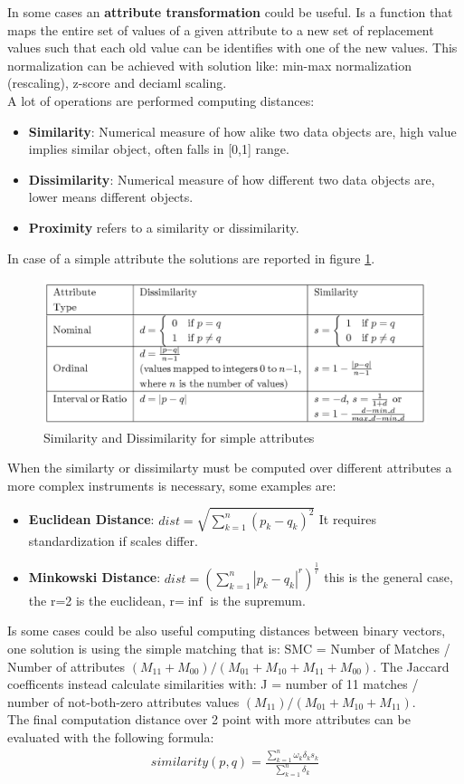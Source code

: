 \documentclass[12pt]{article}
\begin{document}
In some cases an \textbf{attribute transformation} could be useful. Is a function that maps the entire set of values of a given attribute to a new set of replacement values such that each old value can be identifies with one of the new values. This normalization can be achieved with solution like: min-max normalization (rescaling), z-score and deciaml scaling.\\
A lot of operations are performed computing distances:
\begin{itemize}
  \item \textbf{Similarity}: Numerical measure of how alike two data objects are, high value implies similar object, often falls in [0,1] range.
  \item \textbf{Dissimilarity}: Numerical measure of how different two data objects are, lower means different objects.
  \item \textbf{Proximity} refers to a similarity or dissimilarity.
\end{itemize}
In case of a simple attribute the solutions are reported in figure \ref{fig:simdis}.
\begin{figure}[hp!]
  \includegraphics[width=0.9\linewidth]{images/simdis.png}
  \caption{Similarity and Dissimilarity for simple attributes}
  \label{fig:simdis}
\end{figure}
When the similarty or dissimilarty must be computed over different attributes a more complex instruments is necessary, some examples are:
\begin{itemize}
  \item \textbf{Euclidean Distance}: $dist=\sqrt{\sum_{k=1}^{n}(p_k - q_k)^2}$ It requires standardization if scales differ.
  \item \textbf{Minkowski Distance}: $dist=(\sum_{k=1}^{n}|p_k - q_k|^r)^\frac{1}{r}$ this is the general case, the r=2 is the euclidean, r=$\inf$ is the supremum.
\end{itemize}

Is some cases could be also useful computing distances between binary vectors, one solution is using the simple matching that is: SMC = Number of Matches / Number of attributes $(M_11 + M_00) / (M_01 + M_10 + M_11 + M_00)$. The Jaccard coefficents instead calculate similarities with: J = number of 11 matches / number of not-both-zero attributes values $(M_11) / (M_01 + M_10 + M_11)$.\\
The final computation distance over 2 point with more attributes can be evaluated with the following formula:
\begin{equation}
  \begin{gathered}
    similarity(p,q) = \frac{\sum_{k=1}^{n} \omega_k \delta_k s_k}{\sum_{k=1}^{n} \delta_k}
  \end{gathered}
\end{equation}
\end{document}

